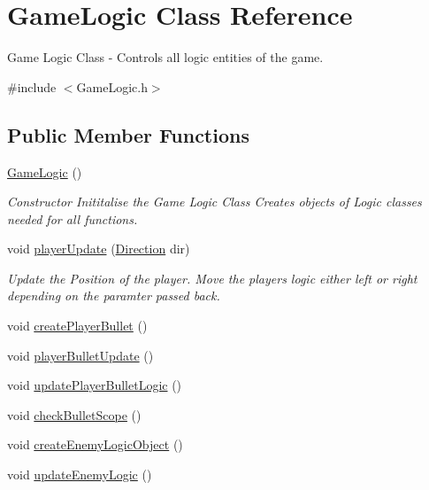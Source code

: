 \hypertarget{class_game_logic}{}\section{Game\+Logic Class Reference}
\label{class_game_logic}


Game Logic Class -\/ Controls all logic entities of the game.  




{\ttfamily \#include $<$Game\+Logic.\+h$>$}

\subsection*{Public Member Functions}
\begin{DoxyCompactItemize}
\item 
\hyperlink{class_game_logic_a996cd781691c36922e7ce792fcb21640}{Game\+Logic} ()
\begin{DoxyCompactList}\small\item\em Constructor Inititalise the Game Logic Class Creates objects of Logic classes needed for all functions. \end{DoxyCompactList}\item 
void \hyperlink{class_game_logic_a3bb909e55fc7c811aa0e3e6a92b881bb}{player\+Update} (\hyperlink{_game_common_data_8h_a224b9163917ac32fc95a60d8c1eec3aa}{Direction} dir)
\begin{DoxyCompactList}\small\item\em Update the Position of the player. Move the players logic either left or right depending on the paramter passed back. \end{DoxyCompactList}\item 
void \hyperlink{class_game_logic_a05dec53eb3c36cf1a669c973fa0b16ae}{create\+Player\+Bullet} ()
\item 
void \hyperlink{class_game_logic_a2293e862afa9caa43ac1c21757b9c914}{player\+Bullet\+Update} ()
\item 
void \hyperlink{class_game_logic_abe02a85cda082eea7d0dc758d8fe3082}{update\+Player\+Bullet\+Logic} ()
\item 
void \hyperlink{class_game_logic_aa0800f256ffc094ee5373d372c26c2ea}{check\+Bullet\+Scope} ()
\item 
void \hyperlink{class_game_logic_ad88d3d16d008722d8a85449beb1ed589}{create\+Enemy\+Logic\+Object} ()
\item 
void \hyperlink{class_game_logic_a07cb8f8cb380fa2cd070aa30148a8ffd}{update\+Enemy\+Logic} ()

\end{DoxyCompactItemize}
